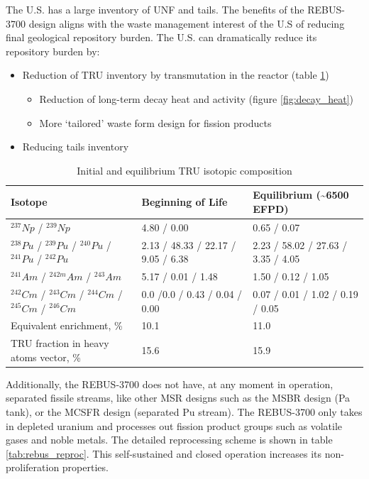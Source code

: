 The U.S. has a large inventory of \gls{UNF} and tails. The benefits
of the REBUS-3700 design aligns with the waste management interest
of the U.S of reducing final geological repository burden. The U.S. can dramatically reduce its repository
burden by:
\begin{itemize}
	\item Reduction of \gls{TRU} inventory by transmutation in the reactor (table \ref{tab:rebus_comp})
	\begin{itemize}
		\item Reduction of long-term decay heat and activity (figure \ref{fig:decay_heat})
		\item More `tailored' waste form design for fission products
	\end{itemize}
	\item Reducing tails inventory
\end{itemize}


\begin{table}[h]
	\centering
	\caption{Initial and equilibrium \gls{TRU} isotopic composition \cite{mourogov_potentialities_2006}}
	\label{tab:rebus_comp}
	\begin{tabular}{lll}
		\hline
		Isotope & Beginning of Life & Equilibrium (\textasciitilde 6500 \gls{EFPD}) \\
		\hline
		$^{237} Np$ / $^{239} Np$ &  4.80 / 0.00 & 0.65 / 0.07 \\
		$^{238} Pu$ / $^{239} Pu$ / $^{240} Pu$ / $^{241} Pu$ / $^{242} Pu$ & 2.13 / 48.33 / 22.17 / 9.05 / 6.38 & 2.23 / 58.02 / 27.63 / 3.35 / 4.05 \\
		$^{241} Am$ / $^{242m} Am$ / $^{243} Am$ &5.17 / 0.01 / 1.48 & 1.50 / 0.12 / 1.05 \\
		$^{242} Cm$ / $^{243} Cm$ / $^{244} Cm$ / $^{245} Cm$ / $^{246} Cm$ & 0.0 /0.0 / 0.43 / 0.04 / 0.00 & 0.07 / 0.01 / 1.02 / 0.19 / 0.05 \\
		Equivalent enrichment, \% & 10.1 & 11.0 \\
		\gls{TRU} fraction in heavy atoms vector, \% & 15.6 & 15.9 \\
		\hline
	\end{tabular}
\end{table}

Additionally, the REBUS-3700 does not have, at any moment in
operation, separated fissile streams, like other \gls{MSR} designs
such as the \gls{MSBR} design \cite{robertson_conceptual_1971} (Pa tank),
or the \gls{MCSFR} design \cite{smith_assessment_1974} (separated Pu stream).
The REBUS-3700 only takes in depleted uranium and processes out
fission product groups such as volatile gases and noble metals.
The detailed reprocessing scheme is shown
in table \ref{tab:rebus_reproc}. 
This self-sustained and closed operation increases its non-proliferation
properties.

